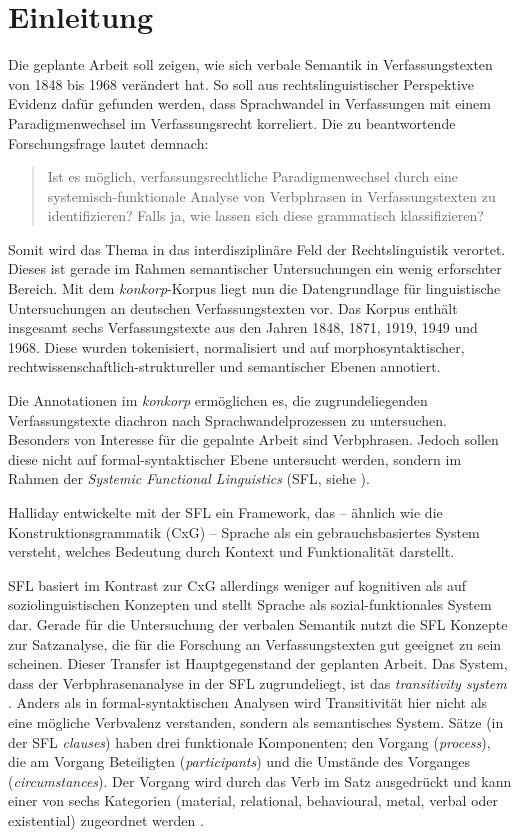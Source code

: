 \section{Einleitung}

Die geplante Arbeit soll zeigen, wie sich verbale Semantik in Verfassungstexten von 1848 bis 1968 verändert hat. So soll aus rechtslinguistischer Perspektive Evidenz dafür gefunden werden, dass Sprachwandel in Verfassungen mit einem Paradigmenwechsel im Verfassungsrecht korreliert. Die zu beantwortende Forschungsfrage lautet demnach:

\begin{quote}
Ist es möglich, verfassungsrechtliche Paradigmenwechsel durch eine systemisch-funktionale Analyse von Verbphrasen in Verfassungstexten zu identifizieren? Falls ja, wie lassen sich diese grammatisch klassifizieren?
\end{quote}


Somit wird das Thema in das interdisziplinäre Feld der Rechtslinguistik verortet. Dieses ist gerade im Rahmen semantischer Untersuchungen ein wenig erforschter Bereich. Mit dem \textit{konkorp}-Korpus \citep{Thurau2025} liegt nun die Datengrundlage für linguistische Untersuchungen an deutschen Verfassungstexten vor. Das Korpus enthält insgesamt sechs Verfassungstexte aus den Jahren 1848, 1871, 1919, 1949 und 1968. Diese wurden tokenisiert, normalisiert und auf morphosyntaktischer, rechtwissenschaftlich-struktureller und semantischer Ebenen annotiert.

Die Annotationen im \textit{konkorp} ermöglichen es, die zugrundeliegenden Verfassungstexte diachron nach Sprachwandelprozessen zu untersuchen. Besonders von Interesse für die gepalnte Arbeit sind Verbphrasen. Jedoch sollen diese nicht auf formal-syntaktischer Ebene untersucht werden, sondern im Rahmen der \textit{Systemic Functional Linguistics} (SFL, siehe \citealt{Halliday1978,Halliday2004}).

Halliday entwickelte mit der SFL ein Framework, das -- ähnlich wie die Konstruktionsgrammatik (CxG) -- Sprache als ein gebrauchsbasiertes System versteht, welches Bedeutung durch Kontext und Funktionalität darstellt.

SFL basiert im Kontrast zur CxG allerdings weniger auf kognitiven als auf soziolinguistischen Konzepten und stellt Sprache als sozial-funktionales System dar. Gerade für die Untersuchung der verbalen Semantik nutzt die SFL Konzepte zur Satzanalyse, die für die Forschung an Verfassungstexten gut geeignet zu sein scheinen. Dieser Transfer ist Hauptgegenstand der geplanten Arbeit. Das System, dass der Verbphrasenanalyse in der SFL zugrundeliegt, ist das \textit{transitivity system} \citep[170]{Halliday2004}. Anders als in formal-syntaktischen Analysen wird Transitivität hier nicht als eine mögliche Verbvalenz verstanden, sondern als semantisches System. Sätze (in der SFL \textit{clauses}) haben drei funktionale Komponenten; den Vorgang (\textit{process}), die am Vorgang Beteiligten (\textit{participants}) und die Umstände des Vorganges (\textit{circumstances}). Der Vorgang wird durch das Verb im Satz ausgedrückt und kann einer von sechs Kategorien (material, relational, behavioural, metal, verbal oder existential) zugeordnet werden \citep[171]{Halliday2004}.


